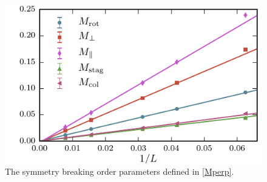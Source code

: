 \documentclass[twocolumn,prb,aps,floatfix,superscriptaddress]{revtex4-1}
\begin{document}
\begin{figure}[]
    \centering
    \includegraphics[width=1.0\linewidth]{order_params_plot.pdf}
    \caption{The symmetry breaking order parameters defined in \eqref{Mperp}.}
    \label{fig:order_params}
\end{figure}





\end{document}
